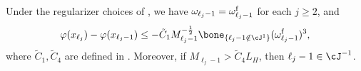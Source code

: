 \begin{lemma}
    \label{lem:proof/transition-between-subsequences-give-valid-regularizer}
    Under the regularizer choices of , 
    we have $\omega_{\ell_{j}-1} = \omega_{\ell_{j}-1}^{\mathrm{f}}$ for each %
    $j \ge 2$,
    and 
    \begin{equation}
        \label{eqn:inexact-mixed-newton-boundary-bound}
        \varphi(x_{\ell_{j}})
        - \varphi(x_{\ell_{j}-1}) 
        \leq 
        -\tilde C_1 M_{\ell_j-1}^{-\frac{1}{2}} \bone_{\{\ell_{j}-1 \notin \cJ^{1}\}} (\omega_{\ell_{j}-1}^{\supfallback})^3,
    \end{equation}
    where $\tilde C_1, \tilde C_4$ are defined in .
    Moreover, if $M_{\ell_j-1} > \tilde C_4 L_H$, then $\ell_j -1 \in\cJ^{-1}$.
\end{lemma}
